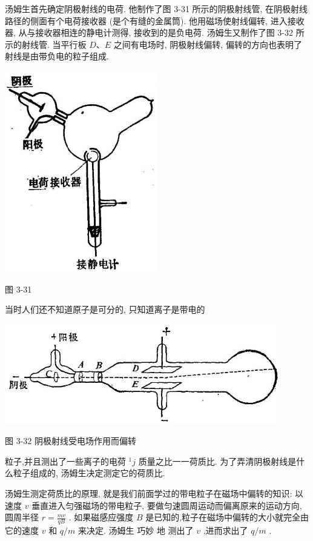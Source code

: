 \documentclass[10pt]{article}
\begin{document}
汤姆生首先确定阴极射线的电荷. 他制作了图 3-31 所示的阴极射线管, 在阴极射线路径的侧面有个电荷接收器 (是个有缝的金属筒). 他用磁场使射线偏转, 进入接收器, 从与接收器相连的静电计测得, 接收到的是负电荷. 汤姆生又制作了图 3-32 所示的射线管. 当平行板 \(D\text{、}E\) 之间有电场时, 阴极射线偏转, 偏转的方向也表明了射线是由带负电的粒子组成.

\begin{center}
\includegraphics[max width=0.5\textwidth]{images/01913056-1f15-74d8-9184-9aab52c9d66b_127_363614.jpg}
\end{center}

图 3-31

当时人们还不知道原子是可分的, 只知道离子是带电的

\begin{center}
\includegraphics[max width=0.9\textwidth]{images/01913056-1f15-74d8-9184-9aab52c9d66b_128_736645.jpg}
\end{center}

图 3-32 阴极射线受电场作用而偏转

粒子,并且测出了一些离子的电荷 \({}^{1}j\) 质量之比一一荷质比. 为了弄清阴极射线是什么粒子组成的, 汤姆生决定测定它的荷质比.

汤姆生测定荷质比的原理, 就是我们前面学过的带电粒子在磁场中偏转的知识: 以速度 \(v\) 垂直进入匀强磁场的带电粒子, 要做匀速圆周运动而偏离原来的运动方向, 圆周半径 \(r = \frac{mv}{qB}\) . 如果磁感应强度 \(B\) 是已知的,粒子在磁场中偏转的大小就完全由它的速度 \(v\) 和 \(q/m\) 来决定. 汤姆生 巧妙 地 测出了 \(v\) ,进而求出了 \(q/m\) .
\end{document}
